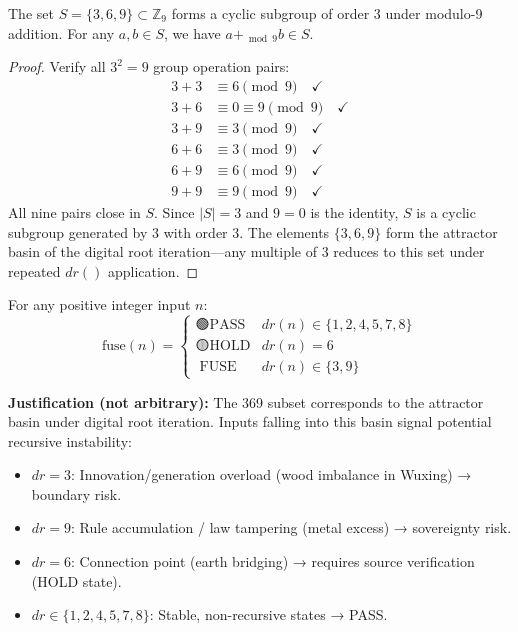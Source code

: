 \documentclass[twocolumn]{article}
\begin{document}
\begin{theorem}
\label{thm:369closure}
The set $S = \{3, 6, 9\} \subset \mathbb{Z}_9$ forms a cyclic subgroup of order 3 under modulo-9 addition. For any $a, b \in S$, we have $a +_{\bmod 9} b \in S$.
\end{theorem}

\begin{proof}
Verify all $3^2 = 9$ group operation pairs:
\begin{align*}
3 + 3 &\equiv 6 \pmod{9} \quad \checkmark \\
3 + 6 &\equiv 0 \equiv 9 \pmod{9} \quad \checkmark \\
3 + 9 &\equiv 3 \pmod{9} \quad \checkmark \\
6 + 6 &\equiv 3 \pmod{9} \quad \checkmark \\
6 + 9 &\equiv 6 \pmod{9} \quad \checkmark \\
9 + 9 &\equiv 9 \pmod{9} \quad \checkmark
\end{align*}
All nine pairs close in $S$. Since $|S| = 3$ and $9 = 0$ is the identity, $S$ is a cyclic subgroup generated by 3 with order 3. The elements $\{3, 6, 9\}$ form the attractor basin of the digital root iteration—any multiple of 3 reduces to this set under repeated $dr()$ application.
\end{proof}

\begin{definition}
For any positive integer input $n$:
\[
\text{fuse}(n) = \begin{cases}
🟢 \text{PASS} & dr(n) \in \{1,2,4,5,7,8\} \\
🟡 \text{HOLD} & dr(n) = 6 \\
🔴 \text{FUSE} & dr(n) \in \{3,9\}
\end{cases}
\]
\end{definition}

\textbf{Justification (not arbitrary):} The 369 subset corresponds to the attractor basin under digital root iteration. Inputs falling into this basin signal potential recursive instability:

\begin{itemize}
  \item $dr = 3$: Innovation/generation overload (wood imbalance in Wuxing) → boundary risk.
  \item $dr = 9$: Rule accumulation / law tampering (metal excess) → sovereignty risk.
  \item $dr = 6$: Connection point (earth bridging) → requires source verification (HOLD state).
  \item $dr \in \{1,2,4,5,7,8\}$: Stable, non-recursive states → PASS.
\end{itemize}
\end{document}
